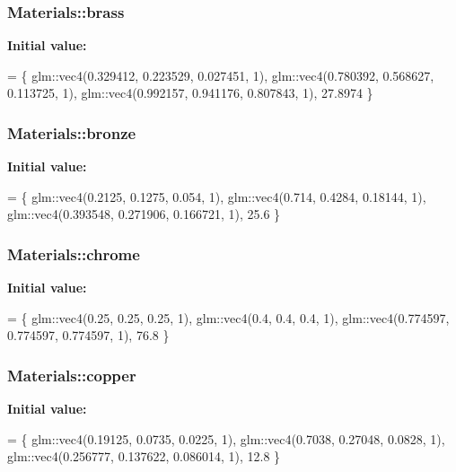 \subsubsection[{\texorpdfstring{brass}{brass}}]{ Materials\+::brass}\hypertarget{namespace_materials_adb662ea7a8869f3cba2dcf125ac0d902}{}\label{namespace_materials_adb662ea7a8869f3cba2dcf125ac0d902}
{\bfseries Initial value\+:}
\begin{DoxyCode}
= \{
        glm::vec4(0.329412, 0.223529, 0.027451, 1),
        glm::vec4(0.780392, 0.568627, 0.113725, 1),
        glm::vec4(0.992157, 0.941176, 0.807843, 1),
        27.8974
    \}
\end{DoxyCode}
\subsubsection[{\texorpdfstring{bronze}{bronze}}]{ Materials\+::bronze}\hypertarget{namespace_materials_aef75c359633b069fb948443f8011afb1}{}\label{namespace_materials_aef75c359633b069fb948443f8011afb1}
{\bfseries Initial value\+:}
\begin{DoxyCode}
= \{
        glm::vec4(0.2125, 0.1275, 0.054, 1),
        glm::vec4(0.714, 0.4284, 0.18144, 1),
        glm::vec4(0.393548, 0.271906, 0.166721, 1),
        25.6
    \}
\end{DoxyCode}
\subsubsection[{\texorpdfstring{chrome}{chrome}}]{ Materials\+::chrome}\hypertarget{namespace_materials_ae1d90d5c8c231d887fd22e459a4632ca}{}\label{namespace_materials_ae1d90d5c8c231d887fd22e459a4632ca}
{\bfseries Initial value\+:}
\begin{DoxyCode}
= \{
        glm::vec4(0.25, 0.25, 0.25, 1),
        glm::vec4(0.4, 0.4, 0.4, 1),
        glm::vec4(0.774597, 0.774597, 0.774597, 1),
        76.8
    \}
\end{DoxyCode}
\subsubsection[{\texorpdfstring{copper}{copper}}]{ Materials\+::copper}\hypertarget{namespace_materials_a00e102c39a09ca4fd6932f43094af174}{}\label{namespace_materials_a00e102c39a09ca4fd6932f43094af174}
{\bfseries Initial value\+:}
\begin{DoxyCode}
= \{
        glm::vec4(0.19125, 0.0735, 0.0225, 1),
        glm::vec4(0.7038, 0.27048, 0.0828, 1),
        glm::vec4(0.256777, 0.137622, 0.086014, 1),
        12.8
    \}
\end{DoxyCode}

